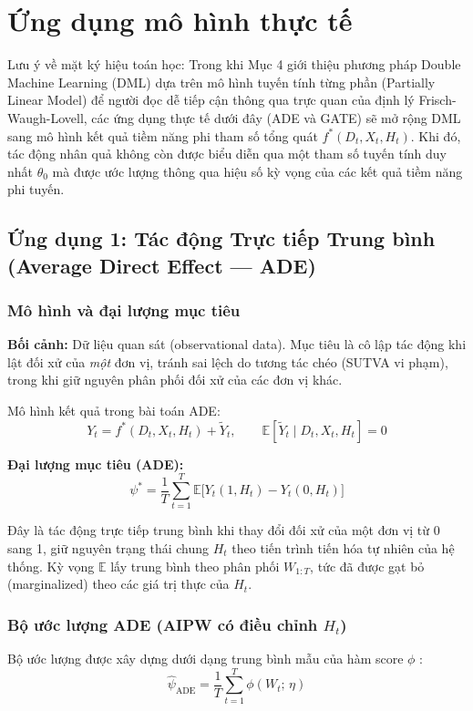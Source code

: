 \section{Ứng dụng mô hình thực tế}

Lưu ý về mặt ký hiệu toán học: Trong khi Mục 4 giới thiệu phương pháp Double Machine Learning (DML) dựa trên mô hình tuyến tính từng phần (Partially Linear Model) để người đọc dễ tiếp cận thông qua trực quan của định lý Frisch-Waugh-Lovell, các ứng dụng thực tế dưới đây (ADE và GATE) sẽ mở rộng DML sang mô hình kết quả tiềm năng phi tham số tổng quát $f^*(D_t, X_t, H_t)$. Khi đó, tác động nhân quả không còn được biểu diễn qua một tham số tuyến tính duy nhất $\theta_0$ mà được ước lượng thông qua hiệu số kỳ vọng của các kết quả tiềm năng phi tuyến.


\subsection{Ứng dụng 1: Tác động Trực tiếp Trung bình (Average Direct Effect --- ADE)}

\subsubsection{Mô hình và đại lượng mục tiêu}

\textbf{Bối cảnh:} Dữ liệu quan sát (observational data). Mục tiêu là cô lập tác động khi lật đối xử của \textit{một} đơn vị, tránh sai lệch do tương tác chéo (SUTVA vi phạm), trong khi giữ nguyên phân phối đối xử của các đơn vị khác.

Mô hình kết quả trong bài toán ADE:
\[
    Y_t = f^*(D_t, X_t, H_t) + \tilde{Y}_t, \qquad \mathbb{E}[\tilde{Y}_t \mid D_t, X_t, H_t] = 0
\]

\textbf{Đại lượng mục tiêu (ADE):}
\[
    \psi^* = \frac{1}{T}\sum_{t=1}^T \mathbb{E}\bigl[Y_t(1, H_t) - Y_t(0, H_t)\bigr]
\]

Đây là tác động trực tiếp trung bình khi thay đổi đối xử của một đơn vị từ 0 sang 1, giữ nguyên trạng thái chung \(H_t\) theo tiến trình tiến hóa tự nhiên của hệ thống. Kỳ vọng \(\mathbb{E}\) lấy trung bình theo phân phối \(W_{1:T}\), tức đã được gạt bỏ (marginalized) theo các giá trị thực của \(H_t\).

\subsubsection{Bộ ước lượng ADE (AIPW có điều chỉnh \(H_t\))}

Bộ ước lượng được xây dựng dưới dạng trung bình mẫu của hàm score \(\phi\) \cite{hays2025double}:
\[
    \hat{\psi}_{\text{ADE}} = \frac{1}{T} \sum_{t=1}^T \phi(W_t;\, \eta)
\]

